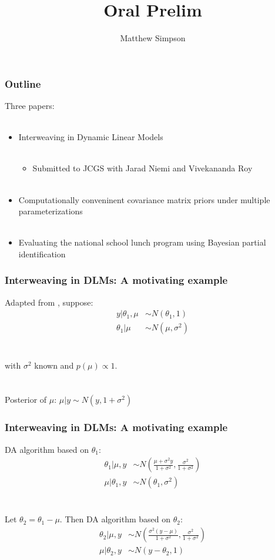 \documentclass[xcolor=dvipsnames]{beamer}
\title[Oral Prelim]{Oral Prelim}
\author[Matt Simpson]{Matthew Simpson}
\date{}
\institute[]{Departments of Statistics and Economics, Iowa State University}
\begin{document}
\begin{frame}
\titlepage
\end{frame}

\begin{frame}
\frametitle{Outline}
Three papers:\\~\\
\begin{itemize}
\item Interweaving in Dynamic Linear Models \\~\\
\begin{itemize}
\item Submitted to JCGS with Jarad Niemi and Vivekananda Roy\\~\\
\end{itemize}
\item Computationally conveninent covariance matrix priors under multiple parameterizations\\~\\
\item Evaluating the national school lunch program using Bayesian partial identification
\end{itemize}
\end{frame}

\begin{frame}
\frametitle{Interweaving in DLMs: A motivating example}
Adapted from \citet{yu2011center}, suppose:\\
\begin{align*}
y|\theta_1, \mu & \sim N(\theta_1, 1) \\
\theta_1|\mu & \sim N(\mu, \sigma^2) 
\end{align*}\\~\\
with $\sigma^2$ known and $p(\mu)\propto 1$.\\~\\~\\

\pause Posterior of $\mu$: $\mu|y \sim N(y,1+\sigma^2)$

\end{frame}

\begin{frame}
\frametitle{Interweaving in DLMs: A motivating example}

DA algorithm based on $\theta_1$:
\begin{align*}
\theta_1|\mu,y &\sim N\left(\frac{\mu + \sigma^2y}{1+\sigma^2}, \frac{\sigma^2}{1+\sigma^2}\right)\\
\mu |\theta_1, y &\sim N(\theta_1, \sigma^2)
\end{align*}\\~\\

\pause Let $\theta_2 = \theta_1 - \mu$. Then DA algorithm based on $\theta_2$:
\begin{align*}
\theta_2|\mu,y &\sim N\left(\frac{\sigma^2(y - \mu)}{1+\sigma^2}, \frac{\sigma^2}{1+\sigma^2}\right)\\
\mu |\theta_2, y &\sim N(y-\theta_2, 1)
\end{align*}
\end{frame}
\end{document}
